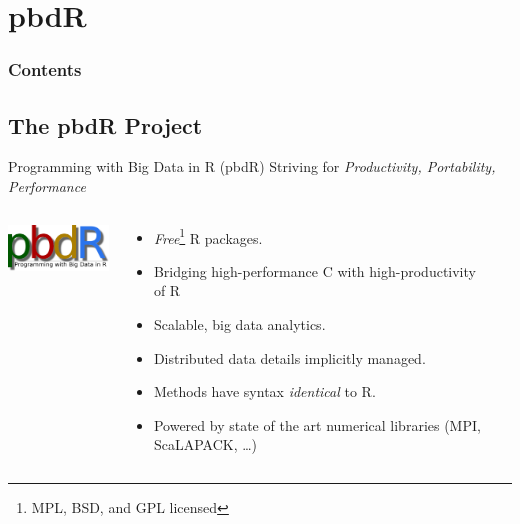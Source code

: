 \section{pbdR}

\hidenum
\begin{frame}[noframenumbering]
\frametitle{Contents}
 \tableofcontents[currentsection,hideothersubsections,sectionstyle=show/hide]
\end{frame}
\shownum


\subsection{The pbdR Project}


\begin{frame}
  \begin{block}{Programming with Big Data in R (pbdR)}
       \centering Striving for \emph{Productivity, Portability, Performance}\\[.4cm]\pause
  \begin{columns}[onlytextwidth]
    \begin{column}{0.30\textwidth}
      \centering
       \includegraphics[width=3.4cm]{pics/simple}\\[.2cm]
    \end{column}
    \begin{column}{0.65\textwidth}
  \begin{itemize}[<+-|alert@+>]
    \item \emph{Free}\footnote{MPL, BSD, and GPL licensed} R packages.
    \item Bridging high-performance C with high-productivity of R
    \item Scalable, big data analytics.
    \item Distributed data details implicitly managed.
    \item Methods have syntax \emph{identical} to R.
    \item Powered by state of the art numerical libraries (MPI, ScaLAPACK, \dots)
  \end{itemize}
    \end{column}
​  \end{columns}
\end{block}
\end{frame}




